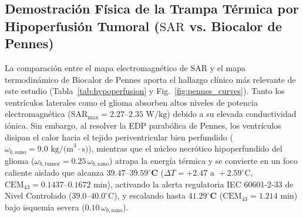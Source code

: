 \documentclass[10pt,journal,compsoc]{IEEEtran}
\begin{document}
\subsection{\texorpdfstring{Demostración Física de la Trampa Térmica por Hipoperfusión Tumoral ($\text{SAR}$ vs. Biocalor de Pennes)}{Demostración Física de la Trampa Térmica por Hipoperfusión Tumoral (SAR vs. Biocalor de Pennes)}}
La comparación entre el mapa electromagnético de $\text{SAR}$ y el mapa termodinámico de Biocalor de Pennes aporta el hallazgo clínico más relevante de este estudio (Tabla~\ref{tab:hypoperfusion} y Fig.~\ref{fig:pennes_curves}). Tanto los ventrículos laterales como el glioma absorben altos niveles de potencia electromagnética ($\text{SAR}_{\max} = 2.27\text{--}2.35\text{ W/kg}$) debido a su elevada conductividad iónica. Sin embargo, al resolver la EDP parabólica de Pennes, los ventrículos disipan el calor hacia el tejido periventricular bien perfundido ($\omega_{b,\text{sano}} = 9.0\text{ kg/(m}^3\cdot\text{s)}$), mientras que el núcleo necrótico hipoperfundido del glioma ($\omega_{b,\text{tumor}} = 0.25\,\omega_{b,\text{sano}}$) atrapa la energía térmica y se convierte en un foco caliente aislado que alcanza $\mathbf{39.47\text{--}39.59^\circ\text{C}}$ ($\Delta T = +2.47\text{ a }+2.59^\circ\text{C}$, $\text{CEM}_{43} = 0.1437\text{--}0.1672\text{ min}$), activando la alerta regulatoria IEC 60601-2-33 de Nivel Controlado ($39.0\text{--}40.0^\circ\text{C}$), y escalando hasta $\mathbf{41.29^\circ\text{C}}$ ($\text{CEM}_{43} = 1.214\text{ min}$) bajo isquemia severa ($0.10\,\omega_{b,\text{sano}}$).

\begin{table}[!t]
\centering
\caption{Efecto de la Hipoperfusión Microvascular Intratumoral ($\omega_{b,\text{tumor}}/\omega_{b,\text{sano}}$) sobre la Temperatura de Pennes y Dosis $\text{CEM}_{43}$ tras $30\text{ min}$ a $3.0\text{ T}$.}
\label{tab:hypoperfusion}
\end{table}
\end{document}
